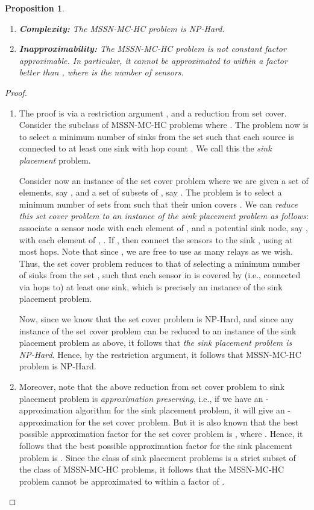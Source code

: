 \documentclass[conference]{IEEEtran}
\newtheorem{proposition}{Proposition}
\begin{document}
\begin{proposition}
\begin{enumerate}
\item \textbf{Complexity: }The MSSN-MC-HC problem is NP-Hard. 
\item \textbf{Inapproximability: }The MSSN-MC-HC problem is not constant factor approximable. In particular, it cannot be approximated to within a factor better than , where  is the number of sensors.
\end{enumerate}
\end{proposition}

\begin{proof}
\begin{enumerate}

\item The proof is via a restriction argument \cite[p. 63, Section 3.2.1]{Garey}, and a reduction from set cover. Consider the subclass of MSSN-MC-HC problems where . The problem now is to select a minimum number of sinks from the set  such that each source is connected to at least one sink with hop count . We call this the \emph{sink placement} problem.  

Consider now an instance of the set cover problem where we are given a set of elements, say , and a set  of subsets of , say . The problem is to select a minimum number of sets from  such that their union covers . We can \emph{reduce this set cover problem to an instance of the sink placement problem as follows}: associate a sensor node with each element of , and a potential sink node, say , with each element  of , . If , then connect the sensors  to the sink , using at most  hops. Note that since , we are free to use as many relays as we wish. Thus, the set cover problem reduces to that of selecting a minimum number of sinks from the set , such that each sensor in  is covered by (i.e., connected via  hops to) at least one sink, which is precisely an instance of the sink placement problem. 

Now, since we know that the set cover problem is NP-Hard, and since any instance of the set cover problem can be reduced to an instance of the sink placement problem as above, it follows that \emph{the sink placement problem is NP-Hard}. Hence, by the restriction argument, it follows that MSSN-MC-HC problem is NP-Hard. 

\item Moreover, note that the above reduction from set cover problem to sink placement problem is \emph{approximation preserving}, i.e., if we have an -approximation algorithm for the sink placement problem, it will give an -approximation for the set cover problem. But it is also known that the best possible approximation factor for the set cover problem is , where . Hence, it follows that the best possible approximation factor for the sink placement problem is . Since the class of sink placement problems is a strict subset of the class of MSSN-MC-HC problems, it follows that the MSSN-MC-HC problem cannot be approximated to within a factor of .
\end{enumerate}
\end{proof}
\end{document}
